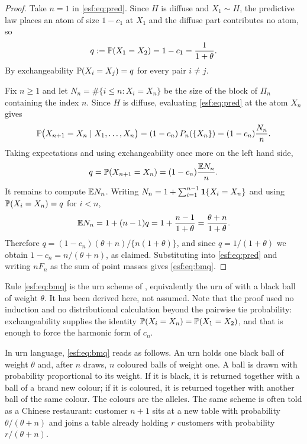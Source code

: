 \begin{proof}
Take $n = 1$ in \eqref{esf:eq:pred}. Since $H$ is diffuse and $X_1 \sim H$, the predictive
law places an atom of size $1 - c_1$ at $X_1$ and the diffuse part contributes no atom,
so
\[
q := \mathbb{P}(X_1 = X_2) = 1 - c_1 = \frac{1}{1+\theta}.
\]
By exchangeability $\mathbb{P}(X_i = X_j) = q$ for every pair $i \ne j$.

Fix $n \ge 1$ and let $N_n = \#\{ i \le n : X_i = X_n \}$ be the size of the block of
$\Pi_n$ containing the index $n$. Since $H$ is diffuse, evaluating \eqref{esf:eq:pred} at
the atom $X_n$ gives
\[
\mathbb{P}\bigl( X_{n+1} = X_n \mid X_1,\dots,X_n \bigr) = (1 - c_n) \, P_n(\{X_n\})
= (1 - c_n) \frac{N_n}{n}.
\]
Taking expectations and using exchangeability once more on the left hand side,
\[
q = \mathbb{P}(X_{n+1} = X_n) = (1 - c_n) \frac{\mathbb{E} N_n}{n}.
\]
It remains to compute $\mathbb{E} N_n$. Writing $N_n = 1 + \sum_{i=1}^{n-1} \mathbf{1}\{X_i = X_n\}$
and using $\mathbb{P}(X_i = X_n) = q$ for $i < n$,
\[
\mathbb{E} N_n = 1 + (n-1) q = 1 + \frac{n-1}{1+\theta} = \frac{\theta + n}{1 + \theta}.
\]
Therefore $q = (1-c_n)(\theta+n) / \{ n (1+\theta) \}$, and since $q = 1/(1+\theta)$ we
obtain $1 - c_n = n/(\theta+n)$, as claimed. Substituting into \eqref{esf:eq:pred} and
writing $n F_n$ as the sum of point masses gives \eqref{esf:eq:bmq}.
\end{proof}

Rule \eqref{esf:eq:bmq} is the urn scheme of \citet{esf:blackwell1973}, equivalently the
urn of \citet{esf:hoppe1984} with a black ball of weight $\theta$. It has been derived here, not assumed. Note that the
proof used no induction and no distributional calculation beyond the pairwise tie
probability: exchangeability supplies the identity $\mathbb{P}(X_i = X_n) = \mathbb{P}(X_1 = X_2)$,
and that is enough to force the harmonic form of $c_n$.

In urn language, \eqref{esf:eq:bmq} reads as follows. An urn holds one black ball of
weight $\theta$ and, after $n$ draws, $n$ coloured balls of weight one. A ball is drawn
with probability proportional to its weight. If it is black, it is returned together
with a ball of a brand new colour; if it is coloured, it is returned together with
another ball of the same colour. The colours are the alleles. The same scheme is often
told as a Chinese restaurant: customer $n+1$ sits at a new table with probability
$\theta/(\theta+n)$ and joins a table already holding $r$ customers with probability
$r/(\theta+n)$.

